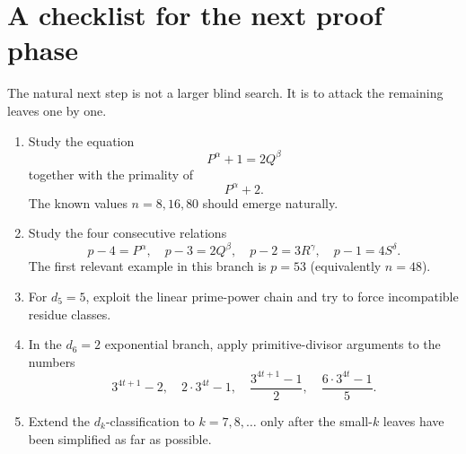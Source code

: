 \documentclass[11pt]{article}
\begin{document}
\section{A checklist for the next proof phase}

The natural next step is not a larger blind search.  It is to attack the
remaining leaves one by one.

\begin{enumerate}[label=\arabic*.]
    \item Study the equation
    \[
    P^\alpha+1=2Q^\beta
    \]
    together with the primality of
    \[
    P^\alpha+2.
    \]
    The known values \(n=8,16,80\) should emerge naturally.

    \item Study the four consecutive relations
    \[
    p-4=P^\alpha,\quad
    p-3=2Q^\beta,\quad
    p-2=3R^\gamma,\quad
    p-1=4S^\delta.
    \]
    The first relevant example in this branch is \(p=53\) (equivalently \(n=48\)).

    \item For \(d_5=5\), exploit the linear prime-power chain and try to force
    incompatible residue classes.

    \item In the \(d_6=2\) exponential branch, apply primitive-divisor
    arguments to the numbers
    \[
    3^{4t+1}-2,\quad
    2\cdot3^{4t}-1,\quad
    \frac{3^{4t+1}-1}{2},
    \quad
    \frac{6\cdot3^{4t}-1}{5}.
    \]

    \item Extend the \(d_k\)-classification to \(k=7,8,\ldots\) only after
    the small-\(k\) leaves have been simplified as far as possible.
\end{enumerate}
\end{document}

